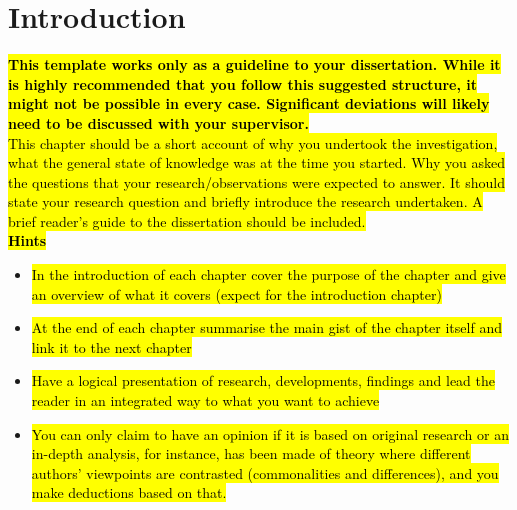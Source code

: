 \documentclass[oneside,12pt]{book}
\begin{document}
\chapter{Introduction}
\hl{\textbf{This template works only as a guideline to your dissertation. While it is highly recommended that you follow this suggested structure, it might not be possible in every case. Significant deviations will likely need to be discussed with your supervisor.}}
\\

\noindent \hl{This chapter should be a short account of why you undertook the
investigation, what the general state of knowledge was at the
time you started. Why you asked the questions that your
research/observations were expected to answer. It should state
your research question and briefly introduce the research
undertaken. A brief reader's guide to the dissertation should be 
included.}
\\

\noindent \hl{\textbf{Hints}}

\begin{itemize}
    \item \hl{In the introduction of each chapter cover the purpose of the chapter and give an overview of what it covers (expect for the introduction chapter)}
    \item \hl{At the end of each chapter summarise the main gist of the chapter itself and link it to the next chapter}
    \item \hl{Have a logical presentation of research, developments, findings and lead the reader in an integrated way to what you want to achieve}
    \item \hl{You can only claim to have an opinion if it is based on original research or an in-depth analysis, for instance, has been made of theory where different authors' viewpoints are contrasted (commonalities and differences), and you make deductions based on that.}
\end{itemize}
\end{document}
